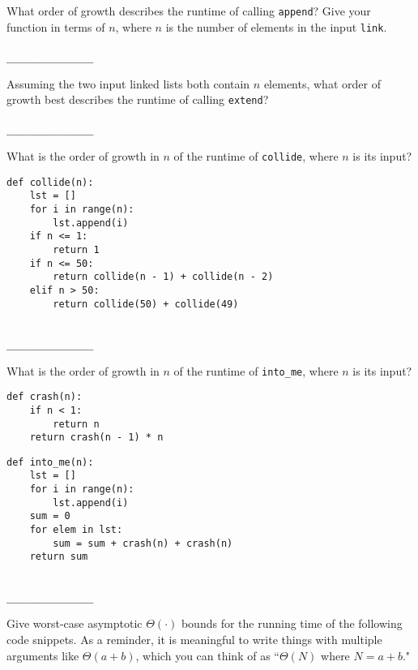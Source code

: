 \documentclass[twoside]{article}
\begin{document}
\begin{enumerate}
\begin{enumerate}
What order of growth describes the runtime of calling \texttt{append}? Give your function in terms of $n$, where $n$ is the number of elements in the input \texttt{link}.
~\\\\
\lstinline{_______________}

Assuming the two input linked lists both contain $n$ elements, what order of growth best describes the runtime of calling \texttt{extend}?
~\\\\
\lstinline{_______________}
\end{enumerate}


\begin{enumerate}
What is the order of growth in $n$ of the runtime of \texttt{collide}, where $n$ is its input?

\begin{lstlisting}
def collide(n):
    lst = []
    for i in range(n):
        lst.append(i)
    if n <= 1:
        return 1
    if n <= 50:
        return collide(n - 1) + collide(n - 2)
    elif n > 50:
        return collide(50) + collide(49)
\end{lstlisting}
~\\
\lstinline{_______________}

What is the order of growth in $n$ of the runtime of \texttt{into\_me}, where $n$ is its input?

\begin{lstlisting}
def crash(n):
    if n < 1:
        return n
    return crash(n - 1) * n
\end{lstlisting}

\begin{lstlisting}
def into_me(n):
    lst = []
    for i in range(n):
        lst.append(i)
    sum = 0
    for elem in lst:
        sum = sum + crash(n) + crash(n)
    return sum
\end{lstlisting}
~\\
\lstinline{_______________}
\end{enumerate}

\newpage


Give worst-case asymptotic $\Theta(\cdot)$ bounds for the running time of the following code snippets. As a reminder, it is meaningful to write things with multiple arguments like $\Theta(a + b)$, which you can think of as ``$\Theta(N)$ where $N = a + b$."


\end{enumerate}
\end{document}
